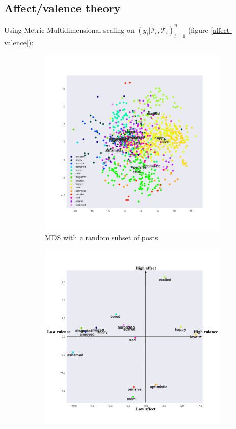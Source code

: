 \documentclass{article} %
\begin{document}
\subsection{Affect/valence theory}

Using Metric Multidimensional scaling on $(y_i | \mathcal{I}_i, \mathcal{T}_i)_{i=1}^n$ (figure \ref{affect-valence}):
\begin{figure}[H]
    \begin{subfigure}[t]{.5\textwidth}
        \vskip 0pt %
        \centering
        \includegraphics[width=\linewidth]{Images/mds.png}
        \caption{MDS with a random subset of posts}
   \end{subfigure}
   \begin{subfigure}[t]{.5\textwidth}
       \vskip 0pt
       \centering
       \includegraphics[width=\linewidth]{Images/mds-center.jpg}

\end{subfigure}
\end{figure}
\end{document}
